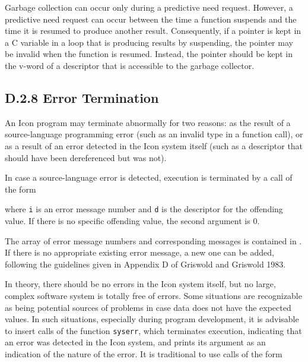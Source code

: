 Garbage collection can occur only during a predictive need
request. However, a predictive need request can occur between the time
a function suspends and the time it is resumed to produce another
result. Consequently, if a pointer is kept in a C variable in a loop
that is producing results by suspending, the pointer may be invalid
when the function is resumed. Instead, the pointer should be kept in
the v-word of a descriptor that is accessible to the garbage
collector.

\subsection[D.2.8 Error Termination]{D.2.8 Error Termination}

An Icon program may terminate abnormally for two reasons: as the
result of a source-language programming error (such as an invalid type
in a function call), or as a result of an error detected in the Icon
system itself (such as a descriptor that should have been dereferenced
but was not).

In case a source-language error is detected, execution is terminated
by a call of the form


\noindent where \texttt{i} is an error message number and \texttt{d} is the
descriptor for the offending value. If there is no specific offending
value, the second argument is 0.

The array of error message numbers and corresponding messages is
contained in . If there is no appropriate existing error
message, a new one can be added, following the guidelines given in
Appendix D of Griswold and Griswold 1983.

In theory, there should be no errors in the Icon system itself, but no
large, complex software system is totally free of errors. Some situations
are recognizable as being potential sources of problems in case data does
not have the expected values. In such situations, especially during program
development, it is advisable to insert calls of the function
\texttt{syserr}, which terminates execution, indicating that an error was
detected in the Icon system, and prints its argument as an indication of
the nature of the error. It is traditional to use calls of the form


